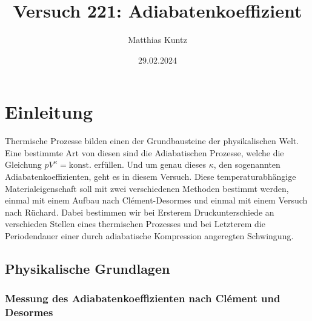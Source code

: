 \documentclass{article}
\title{Versuch 221: Adiabatenkoeffizient}
\author{Matthias Kuntz}
\date{29.02.2024}
\begin{document}
\maketitle

\tableofcontents

\newpage

\section{Einleitung}

Thermische Prozesse bilden einen der Grundbausteine der physikalischen Welt. Eine bestimmte Art von diesen sind die Adiabatischen Prozesse, welche die Gleichung $pV^\kappa = \text{konst.}$ erfüllen. Und um genau dieses $\kappa$, den sogenannten Adiabatenkoeffizienten, geht es in diesem Versuch. Diese temperaturabhängige Materialeigenschaft soll mit zwei verschiedenen Methoden bestimmt werden, einmal mit einem Aufbau nach Clément-Desormes und einmal mit einem Versuch nach Rüchard. Dabei bestimmen wir bei Ersterem Druckunterschiede an verschieden Stellen eines thermischen Prozesses und bei Letzterem die Periodendauer einer durch adiabatische Kompression angeregten Schwingung.  

\subsection{Physikalische Grundlagen}

\subsubsection{Messung des Adiabatenkoeffizienten nach Clément und Desormes}
\end{document}
